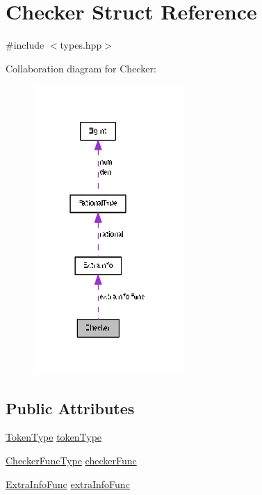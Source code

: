 \hypertarget{struct_checker}{}\section{Checker Struct Reference}
\label{struct_checker}


{\ttfamily \#include $<$types.\+hpp$>$}



Collaboration diagram for Checker\+:
\nopagebreak
\begin{figure}[H]
\begin{center}
\leavevmode
\includegraphics[width=162pt]{struct_checker__coll__graph}
\end{center}
\end{figure}
\subsection*{Public Attributes}
\begin{DoxyCompactItemize}
\item 
\hyperlink{all_8hpp_aa520fbf142ba1e7e659590c07da31921}{Token\+Type} \hyperlink{struct_checker_a87c6d1c0eaf4ab64bffb9db5b78de6c7}{token\+Type}
\item 
\hyperlink{arch_8hpp_a13b498be54dff1ea392069f686d1ec34}{Checker\+Func\+Type} \hyperlink{struct_checker_a5f7c0eb1e12fb66165024172098144d0}{checker\+Func}
\item 
\hyperlink{arch_8hpp_a54711df39cdddaf5689936689dbe279e}{Extra\+Info\+Func} \hyperlink{struct_checker_a4d1a63a813dbc6b1668e8568d04b4cbc}{extra\+Info\+Func}
\end{DoxyCompactItemize}


